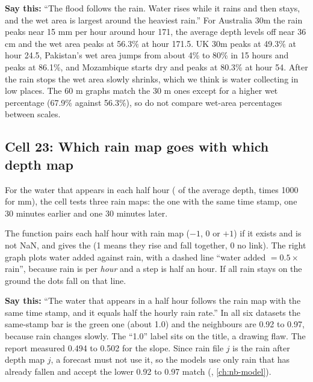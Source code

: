 \textbf{Say this:} ``The flood follows the rain. Water rises while it rains and then stays, and the wet area is largest around the heaviest rain.'' For Australia 30m the rain peaks near 15 mm per hour around hour 171, the average depth levels off near 36 cm and the wet area peaks at 56.3\% at hour 171.5. UK 30m peaks at 49.3\% at hour 24.5, Pakistan's wet area jumps from about 4\% to 80\% in 15 hours and peaks at 86.1\%, and Mozambique starts dry and peaks at 80.3\% at hour 54. After the rain stops the wet area slowly shrinks, which we think is water collecting in low places. The 60 m graphs match the 30 m ones except for a higher wet percentage (67.9\% against 56.3\%), so do not compare wet-area percentages between scales.

\subsection{Cell 23: Which rain map goes with which depth map}
For the water that appears in each half hour ( of the average depth, times 1000 for mm), the cell tests three rain maps: the one with the same time stamp, one 30 minutes earlier and one 30 minutes later.

The function pairs each half hour  with rain map  ($-1$, 0 or $+1$) if it exists and is not NaN, and  gives the  (1 means they rise and fall together, 0 no link). The right graph plots water added against rain, with a dashed line ``water added $=0.5\times$ rain'', because rain is per \emph{hour} and a step is half an hour. If all rain stays on the ground the dots fall on that line.

\textbf{Say this:} ``The water that appears in a half hour follows the rain map with the same time stamp, and it equals half the hourly rain rate.'' In all six datasets the same-stamp bar is the green one (about 1.0) and the neighbours are 0.92 to 0.97, because rain changes slowly. The ``1.0'' label sits on the title, a drawing flaw. The report measured 0.494 to 0.502 for the slope. Since rain file $j$ is the rain after depth map $j$, a forecast must not use it, so the models use only rain that has already fallen and accept the lower 0.92 to 0.97 match (, \ref{ch:nb-model}).

